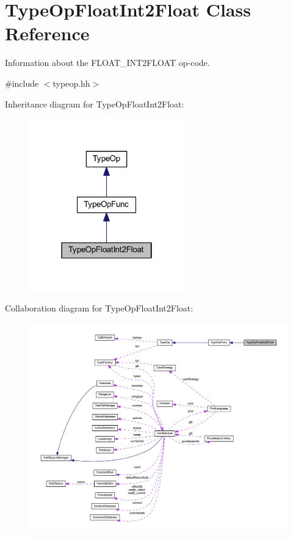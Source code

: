 \hypertarget{class_type_op_float_int2_float}{}\section{Type\+Op\+Float\+Int2\+Float Class Reference}
\label{class_type_op_float_int2_float}


Information about the F\+L\+O\+A\+T\+\_\+\+I\+N\+T2\+F\+L\+O\+AT op-\/code.  




{\ttfamily \#include $<$typeop.\+hh$>$}



Inheritance diagram for Type\+Op\+Float\+Int2\+Float\+:
\nopagebreak
\begin{figure}[H]
\begin{center}
\leavevmode
\includegraphics[width=190pt]{class_type_op_float_int2_float__inherit__graph}
\end{center}
\end{figure}


Collaboration diagram for Type\+Op\+Float\+Int2\+Float\+:
\nopagebreak
\begin{figure}[H]
\begin{center}
\leavevmode
\includegraphics[width=350pt]{class_type_op_float_int2_float__coll__graph}
\end{center}
\end{figure}
